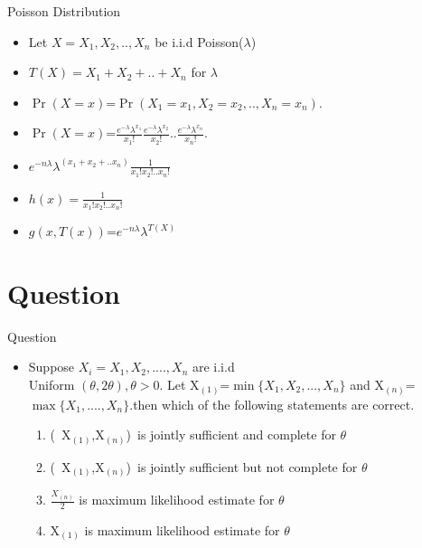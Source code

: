 \documentclass[aspectratio=169,xcolor=dvipsnames]{beamer}
\begin{document}
\begin{frame}{Poisson Distribution}
  \begin{itemize}
      \item Let $X={X_1,X_2,..,X_n}$ be i.i.d Poisson($\lambda$)
      \item $T(X)=X_1+X_2+..+X_n$ for $\lambda$
      \item $\Pr{(X=x)}$=$\Pr{(X_1=x_1,X_2=x_2,..,X_n=x_n)}$.
      \item $\Pr{(X=x)}$=$\frac{e^{-\lambda}\lambda^{x_1}}{x_1!}$$\frac{e^{-\lambda}\lambda^{x_2}}{x_2!}$..$\frac{e^{-\lambda}\lambda^{x_n}}{x_n!}$.
      \item $e^{-n\lambda}\lambda^{(x_1+x_2+..x_n)}\frac{1}{x_1!x_2!..x_n!}$
      \item $h(x)=\frac{1}{x_1!x_2!..x_n!}$
      \item $g(x,T(x))$=$e^{-n\lambda}\lambda^{T(X)}$
  \end{itemize}
\end{frame}

\section{Question}

\begin{frame}{Question}
  \begin{itemize}
      \item Suppose $X_i=X_1,X_2,....,X_n$ are i.i.d \\ Uniform $(\theta,2\theta),\theta> 0$. Let X$_{(1)}$=$\min\{X_1,X_2,...,X_n\}$ and 
      X$_{(n)}$=$\max\{X_1,....,X_n\}$.then which of the following statements are correct.
 
      \begin{enumerate}
          \item (\ X$_{(1)}$,X$_{(n)}$)\ is jointly sufficient and complete for $\theta$
          \item (\ X$_{(1)}$,X$_{(n)}$)\ is jointly sufficient but not complete for
          $\theta$
          \item $\frac{X_{(n)}}{2}$ is maximum likelihood estimate for $\theta$
          \item X$_{(1)}$ is maximum likelihood estimate for $\theta$
    
      \end{enumerate}
  \end{itemize}
\end{frame}
\end{document}
